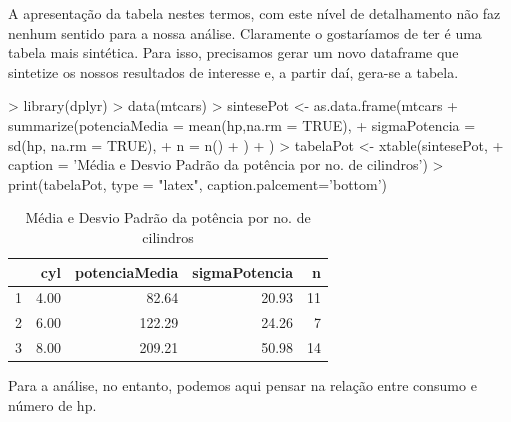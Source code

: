 \documentclass[12pt,a4paper,oneside]{erdc}
\begin{document}
A apresentação da tabela nestes termos, com este nível de detalhamento não faz nenhum sentido para a nossa análise. Claramente o gostaríamos de ter é uma tabela mais sintética. Para isso, precisamos gerar um novo dataframe que sintetize os nossos resultados de interesse e, a partir daí, gera-se a tabela.		

\begin{Schunk}
\begin{Sinput}
> library(dplyr)
> data(mtcars)
> sintesePot <- as.data.frame(mtcars %
+                     summarize(potenciaMedia = mean(hp,na.rm = TRUE),
+                               sigmaPotencia = sd(hp, na.rm = TRUE),
+                               n = n()
+                             )
+                     )
> tabelaPot <- xtable(sintesePot, 
+ 			 caption = 'Média e Desvio Padrão da potência por no. de cilindros')
> print(tabelaPot, type = "latex", caption.palcement='bottom')
\end{Sinput}
\begin{table}[ht]
\centering
\begin{tabular}{rrrrr}
  \hline
 & cyl & potenciaMedia & sigmaPotencia & n \\ 
  \hline
1 & 4.00 & 82.64 & 20.93 &  11 \\ 
  2 & 6.00 & 122.29 & 24.26 &   7 \\ 
  3 & 8.00 & 209.21 & 50.98 &  14 \\ 
   \hline
\end{tabular}
\caption{Média e Desvio Padrão da potência por no. de cilindros} 
\end{table}\end{Schunk}

	
Para a análise, no entanto, podemos aqui pensar na relação entre consumo e número de hp.
\end{document}
